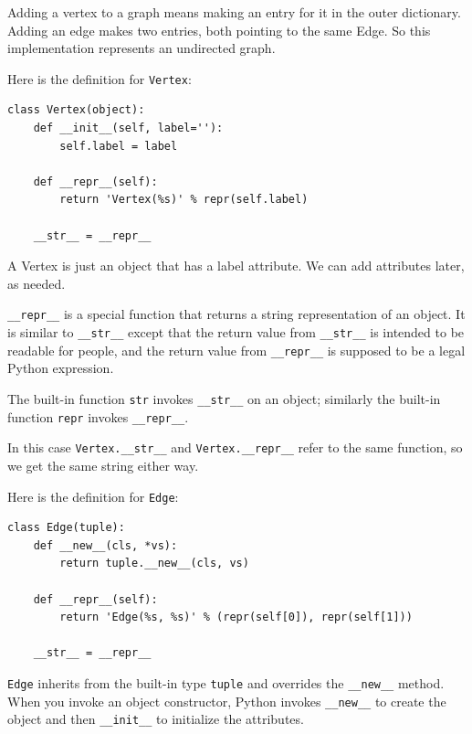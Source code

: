 \documentclass[10pt]{book}
\begin{document}
Adding a vertex to a graph means making an entry for it in the
outer dictionary.  Adding an edge makes two entries, both pointing
to the same Edge.  So this implementation represents an undirected
graph.

Here is the definition for {\tt Vertex}:

\begin{verbatim}
class Vertex(object):
    def __init__(self, label=''):
        self.label = label

    def __repr__(self):
        return 'Vertex(%s)' % repr(self.label)

    __str__ = __repr__
\end{verbatim}

A Vertex is just an object that has a label attribute.  We can
add attributes later, as needed.

\verb"__repr__" is a special function that returns a string
representation of an object.  It is similar to \verb"__str__" except
that the return value from \verb"__str__" is intended to be readable
for people, and the return value from \verb"__repr__" is supposed to
be a legal Python expression.

The built-in function {\tt str} invokes \verb"__str__" on
an object; similarly the built-in function {\tt repr} invokes
\verb"__repr__".

In this case \verb"Vertex.__str__" and \verb"Vertex.__repr__" refer to
the same function, so we get the same string either way.

Here is the definition for {\tt Edge}:

\begin{verbatim}
class Edge(tuple):
    def __new__(cls, *vs):
        return tuple.__new__(cls, vs)

    def __repr__(self):
        return 'Edge(%s, %s)' % (repr(self[0]), repr(self[1]))

    __str__ = __repr__
\end{verbatim}

{\tt Edge} inherits from the built-in type {\tt tuple}
and overrides the \verb"__new__" method.  When you invoke
an object constructor, Python invokes \verb"__new__" to create
the object and then \verb"__init__" to initialize the attributes.
\end{document}
